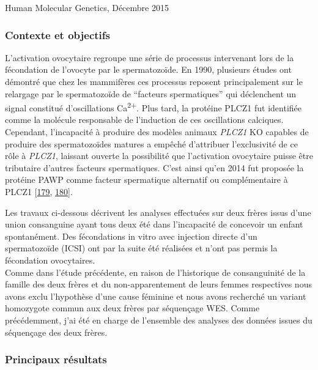 \documentclass[12pt,a4paper,twoside]{ugathesis}
\theoremstyle{definition}
\theoremstyle{definition}
\theoremstyle{definition}
\theoremstyle{remark}
\begin{document}
Human Molecular Genetics, Décembre 2015

\newpage

\subsubsection{Contexte et objectifs}\label{contexte-et-objectifs-1}

L'activation ovocytaire regroupe une série de processus intervenant lors
de la fécondation de l'ovocyte par le spermatozoïde. En 1990, plusieurs
études ont démontré que chez les mammifères ces processus reposent
principalement sur le relargage par le spermatozoïde de ``facteurs
spermatiques'' qui déclenchent un signal constitué d'oscillations
Ca\textsuperscript{2+}. Plus tard, la protéine PLCZ1 fut identifiée
comme la molécule responsable de l'induction de ces oscillations
calciques. Cependant, l'incapacité à produire des modèles animaux
\emph{PLCZ1} KO capables de produire des spermatozoïdes matures a
empêché d'attribuer l'exclusivité de ce rôle à \emph{PLCZ1}, laissant
ouverte la possibilité que l'activation ovocytaire puisse être
tributaire d'autres facteurs spermatiques. C'est ainsi qu'en 2014 fut
proposée la protéine PAWP comme facteur spermatique alternatif ou
complémentaire à PLCZ1 {[}\protect\hyperlink{ref-Aarabi2014}{179},
\protect\hyperlink{ref-Aarabi2014a}{180}{]}.

Les travaux ci-dessous décrivent les analyses effectuées sur deux frères
issus d'une union consanguine ayant tous deux été dans l'incapacité de
concevoir un enfant spontanément. Des fécondations in vitro avec
injection directe d'un spermatozoïde (ICSI) ont par la suite été
réalisées et n'ont pas permis la fécondation ovocytaires.\\
Comme dans l'étude précédente, en raison de l'historique de
consanguinité de la famille des deux frères et du non-apparentement de
leurs femmes respectives nous avons exclu l'hypothèse d'une cause
féminine et nous avons recherché un variant homozygote commun aux deux
frères par séquençage WES. Comme précédemment, j'ai été en charge de
l'ensemble des analyses des données issues du séquençage des deux
frères.

\newpage



\newpage

\subsubsection{Principaux résultats}\label{principaux-resultats-1}
\end{document}
